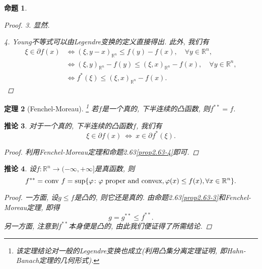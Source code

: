 \documentclass[12pt,a4paper]{article}
\newtheorem{theorem}{定理}[section]
\newtheorem{proposition}[theorem]{命题}
\newtheorem{corollary}[theorem]{推论}
\begin{document}
\begin{proposition}
\begin{proof}
        3. 显然.
    
        4. Young不等式可以由Legendre变换的定义直接得出. 此外, 我们有 
        \begin{align*}
            \xi \in \partial f(x) &\Longleftrightarrow (\xi, y - x)_{\mathbb{R}^n} \leq f(y) - f(x), \quad \forall y \in \mathbb{R}^n, \\ 
            &\Longleftrightarrow (\xi, y)_{\mathbb{R}^n} - f(y) \leq (\xi, x)_{\mathbb{R}^n} - f(x), \quad \forall y \in \mathbb{R}^n, \\ 
            &\Longleftrightarrow f^*(\xi) \leq (\xi, x)_{\mathbb{R}^n} - f(x).
        \end{align*}
    \end{proof}
\end{proposition}

\begin{theorem}[Fenchel-Moreau]\footnote{该定理结论对一般的Legendre变换也成立(利用凸集分离定理证明, 即Hahn-Banach定理的几何形式).}
    若$f$是一个真的, 下半连续的凸函数, 则$f^{**} = f$.
\end{theorem}

\begin{corollary}\label{coro2.65}
    对于一个真的, 下半连续的凸函数$f$, 我们有 
    \begin{equation*}
        \xi \in \partial f(x) \ \Longleftrightarrow \ x \in \partial f^*(\xi).
    \end{equation*}
    \begin{proof}
        利用Fenchel-Moreau定理和命题2.63\eqref{prop2.63-4}即可.
    \end{proof}
\end{corollary}

\begin{corollary}
    设$f\colon \mathbb{R}^n \rightarrow (-\infty, +\infty]$是真函数, 则 
    \begin{equation*}
        f^{**} = {\rm conv}\ f = \sup\{\varphi \colon \varphi\ \text{proper and convex}, \varphi (x) \leq f(x), \forall x \in \mathbb{R}^n\}.
    \end{equation*}
    \begin{proof}
        一方面, 设$g \leq f$是凸的, 则它还是真的. 由命题2.63\eqref{prop2.63-3}和Fenchel-Moreau定理, 即得 
        \begin{equation*}
            g = g^{**} \leq f^{**}.
        \end{equation*}
        另一方面, 注意到$f^{**}$本身便是凸的, 由此我们便证得了所需结论.
    \end{proof}
\end{corollary}
\end{document}
